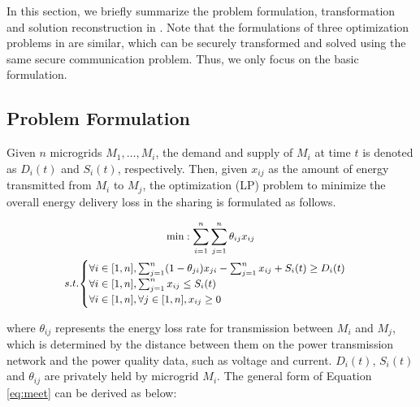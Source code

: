 In this section, we briefly summarize the problem formulation, transformation and solution reconstruction in \cite{HongIJER15}. Note that the formulations of three optimization problems in \cite{HongIJER15} are similar, which can be securely transformed and solved using the same secure communication problem. Thus, we only focus on the basic formulation. 

\subsection{Problem Formulation}

Given $n$ microgrids $M_1,\dots, M_i$, the demand and supply of $M_i$ at time $t$ is denoted as $D_i(t)$ and $S_i(t)$, respectively. Then, given $x_{ij}$ as the amount of energy transmitted from $M_i$ to $M_j$, the optimization (LP) problem to minimize the overall energy delivery loss in the sharing is formulated as follows.

\begin{equation}
\small
\begin{gathered}
\min: \sum_{i=1}^{n}\sum_{j=1}^n \theta_{ij}x_{ij}\\
s.t.{\centering
	\begin{cases}
	\forall i\in[1,n], \sum_{j=1}^n(1-\theta_{ji})
	x_{ji}-\sum_{j=1}^nx_{ij}+S_i(t)\geq D_i(t)\\
	\forall i\in[1,n], \sum_{j=1}^nx_{ij} \leq S_i(t)\\
	\forall i\in [1,n], \forall j\in[1,n], x_{ij}\geq 0
	\end{cases}}
\end{gathered}\label{eq:meet}
\end{equation}

where $\theta_{ij}$ represents the energy loss rate for transmission between $M_i$ and $M_j$, which is determined by the distance between them on the power transmission network and the power quality data, such as voltage and current. $D_i(t)$, $S_i(t)$ and $\theta_{ij}$ are privately held by microgrid $M_i$. The general form of Equation \ref{eq:meet} can be derived as below:

